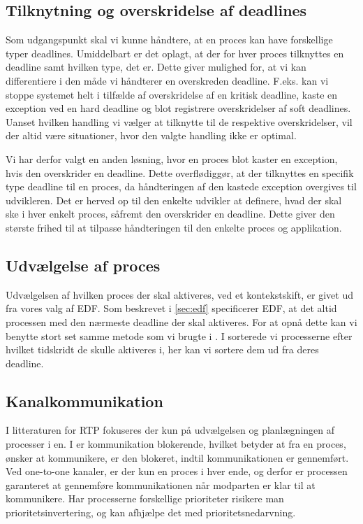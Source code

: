 \subsection{Tilknytning og overskridelse af deadlines}
Som udgangspunkt skal vi kunne håndtere, at en proces kan have forskellige typer deadlines. Umiddelbart er det oplagt, at der for hver proces tilknyttes en deadline samt hvilken type, det er. Dette giver mulighed for, at vi kan differentiere i den måde vi håndterer en overskreden deadline. F.eks. kan vi stoppe systemet helt i tilfælde af overskridelse af en kritisk deadline, kaste en exception ved en hard deadline og blot registrere overskridelser af soft deadlines. Uanset hvilken handling vi vælger at tilknytte til de respektive overskridelser, vil der altid være situationer, hvor den valgte handling ikke er optimal. 

Vi har derfor valgt en anden løsning, hvor en proces blot kaster en exception, hvis den overskrider en deadline. Dette overflødiggør, at der tilknyttes en specifik type deadline til en proces, da håndteringen af den kastede exception overgives til udvikleren. Det er herved op til den enkelte udvikler at definere, hvad der skal ske i hver enkelt proces, såfremt den overskrider en deadline. Dette giver den største frihed til at tilpasse håndteringen til den enkelte proces og applikation. 

\subsection{Udvælgelse af proces}
Udvælgelsen af hvilken proces der skal aktiveres, ved et kontekstskift, er givet ud fra vores valg af EDF. Som beskrevet i \cref{sec:edf} specificerer EDF, at det altid processen med den nærmeste deadline der skal aktiveres. For at opnå dette kan vi benytte stort set samme metode som vi brugte i \des. I \des sorterede vi processerne efter hvilket tidskridt de skulle aktiveres i, her kan vi sortere dem ud fra deres deadline.  

\subsection{Kanalkommunikation}\label{sec:rtp-kommunikation}
I litteraturen for  RTP fokuseres der kun på udvælgelsen og planlægningen af processer i \sched en. I \pycsp er kommunikation blokerende, hvilket betyder at fra en proces, ønsker at kommunikere, er den blokeret, indtil kommunikationen er gennemført. Ved one-to-one kanaler, er der kun en proces i hver ende, og derfor er  processen garanteret at gennemføre kommunikationen når modparten er klar til at kommunikere. Har processerne forskellige prioriteter risikere man prioritetsinvertering, og kan afhjælpe det med prioritetsnedarvning. 

